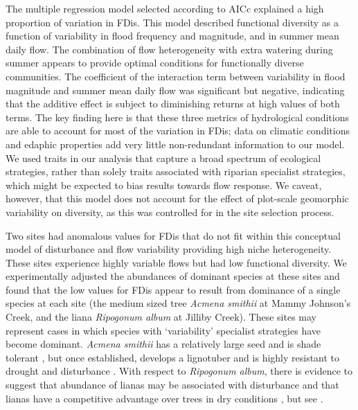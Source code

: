 \documentclass[openright,12pt,a4paper]{memoir}
\begin{document}
The multiple regression model selected according to AICc explained a high proportion of variation in FDis. This model described functional diversity as a function of variability in flood frequency and magnitude, and in summer mean daily flow. The combination of flow heterogeneity with extra watering during summer appears to provide optimal conditions for functionally diverse communities. The coefficient of the interaction term between variability in flood magnitude and summer mean daily flow was significant but negative, indicating that the additive effect is subject to diminishing returns at high values of both terms. The key finding here is that these three metrics of hydrological conditions are able to account for most of the variation in FDis; data on climatic conditions and edaphic properties add very little non-redundant information to our model. We used traits in our analysis that capture a broad spectrum of ecological strategies, rather than solely traits associated with riparian specialist strategies, which might be expected to bias results towards flow response. We caveat, however, that this model does not account for the effect of plot-scale geomorphic variability on diversity, as this was controlled for in the site selection process.
 
Two sites had anomalous values for FDis that do not fit within this conceptual model of disturbance and flow variability providing high niche heterogeneity. These sites experience highly variable flows but had low functional diversity. We experimentally adjusted the abundances of dominant species at these sites and found that the low values for FDis appear to result from dominance of a single species at each site (the medium sized tree \textit{Acmena smithii} at Mammy Johnson’s Creek, and the liana \textit{Ripogonum album} at Jilliby Creek). These sites may represent cases in which species with ‘variability’ specialist strategies have become dominant. \textit{Acmena smithii} has a relatively large seed and is shade tolerant \cite{Melick1990}, but once established, develops a lignotuber and is highly resistant to drought and disturbance \cite{Ashton1976}. With respect to \textit{Ripogonum album}, there is evidence to suggest that abundance of lianas may be associated with disturbance \cite{Laurance2001} and that lianas have a competitive advantage over trees in dry conditions \cite{Swaine2007, Cai2009}, but see \cite{Nepstad2007}.
 
\end{document}
